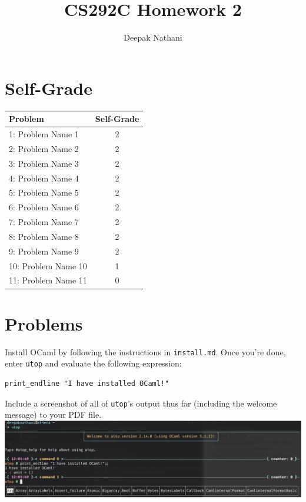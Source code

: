 \documentclass{jhwhw}
\author{Deepak Nathani}
\title{CS292C Homework 2}
\begin{document}
\maketitle

\section{Self-Grade}

\begin{table}[h]
    \centering
    \begin{tabular}{l|c}
        \toprule
        \midrule
        \textbf{Problem} & \textbf{Self-Grade} \\
        \midrule
        {1: Problem Name 1} & {2} \\
        \midrule
        {2: Problem Name 2} & {2} \\
        \midrule
        {3: Problem Name 3} & {2} \\
        \midrule
        {4: Problem Name 4} & {2} \\
        \midrule
        {5: Problem Name 5} & {2} \\
        \midrule
        {6: Problem Name 6} & {2} \\
        \midrule
        {7: Problem Name 7} & {2} \\
        \midrule
        {8: Problem Name 8} & {2} \\
        \midrule
        {9: Problem Name 9} & {2} \\
        \midrule
        {10: Problem Name 10} & {1} \\
        \midrule
        {11: Problem Name 11} & {0} \\
        \midrule
        \bottomrule
    \end{tabular}
\end{table}

\section{Problems}
Install OCaml by following the instructions in \texttt{install.md}.
Once you're done, enter \texttt{utop} and evaluate the following expression:
\begin{lstlisting}
print_endline "I have installed OCaml!"
\end{lstlisting}
Include a screenshot of all of \texttt{utop}'s output thus far (including the welcome message) to your PDF file.
\newline
\solution
\includegraphics[width=\textwidth]{assets/problem1.png}
\end{document}
